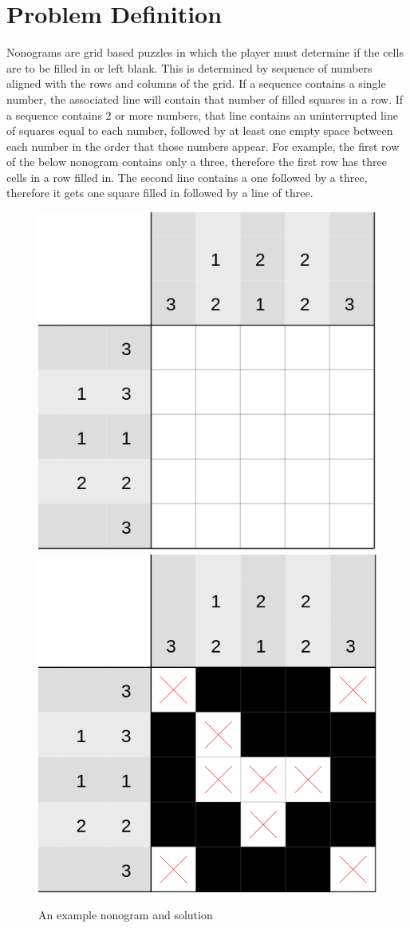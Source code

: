 \documentclass[12pt, a4paper]{article}
\begin{document}
\nocite{*}



\tableofcontents
\newpage
{}
\setcounter{lastroman}{\value{page}}
\maketitle
\section{Problem Definition}
Nonograms are grid based puzzles in which the player must determine if the cells are to be filled in or left blank. This is determined by sequence of numbers aligned with the rows and columns of the grid. If a sequence contains a single number, the associated line will contain that number of filled squares in a row. If a sequence contains 2 or more numbers, that line contains an uninterrupted line of squares equal to each number, followed by at least one empty space between each number in the order that those numbers appear. For example, the first row of the below nonogram contains only a three, therefore the first row has three cells in a row filled in. The second line contains a one followed by a  three, therefore it gets one square filled in followed by a line of three.


\begin{figure}[H]
    \centering
    {\includegraphics[width=0.4\linewidth]{fig/nonogram.png}}\hfill
    {\includegraphics[width=0.4\linewidth]{fig/canvas.png}}
        \caption{An example nonogram and solution}
    \label{fig:enter-label}
\end{figure}
\end{document}
